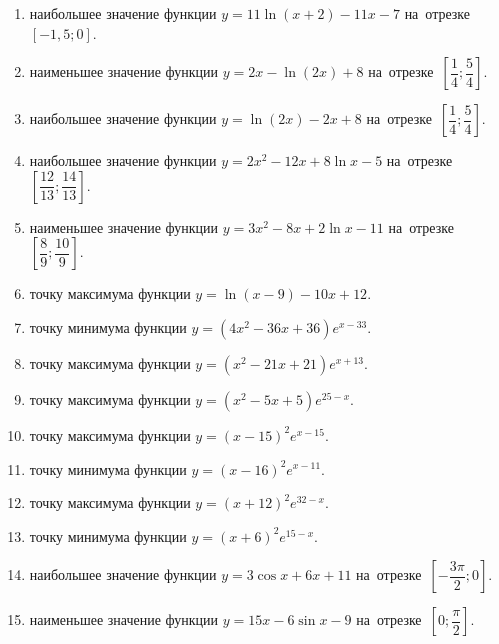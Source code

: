 \documentclass[a4paper,10pt]{article}
\begin{document}
\begin{enumerate}
\item {} наибольшее значение функции $y = 11\ln \left(x+2\right)-11x -7$ на~отрезке~$\left[-1,5;0\right]$.

\item {} наименьшее значение функции $y = 2x-\ln \left(2x\right)+8$ на~отрезке~$\left[\dfrac{1}{4};\dfrac{5}{4}\right]$.

\item {} наибольшее значение функции $y = \ln \left(2x\right)-2x+8$ на~отрезке~$\left[\dfrac{1}{4};\dfrac{5}{4}\right]$.

\item {} наибольшее значение функции $y=2x^2-12x+8\ln x-5$ на~отрезке~$\left[\dfrac{12}{13};\dfrac{14}{13}\right]$.

\item {} наименьшее значение функции $y=3x^2-8x+2\ln x-11$ на~отрезке~$\left[\dfrac{8}{9};\dfrac{10}{9}\right]$.

\item {} точку максимума функции $y=\ln \left(x-9\right)-10x+12$.

\item {} точку минимума функции $y=\left(4x^2-36x+36\right)e^{x-33}$.

\item {} точку максимума функции $y=\left(x^2-21x+21\right)e^{x+13}$.

\item {} точку максимума функции $y=\left(x^2-5x+5\right)e^{25-x}$.

\item {} точку максимума функции $y=\left(x -15\right)^2e^{x-15}$.

\item {} точку минимума функции $y=\left(x -16\right)^2e^{x-11}$.

\item {} точку максимума функции $y=\left(x +12\right)^2e^{32-x}$.

\item {} точку минимума функции $y=\left(x +6\right)^2e^{15-x}$.

\item {} наибольшее значение функции $y=3\cos x+6x +11$ на~отрезке~$\left[-\dfrac{3\pi }{2};0\right]$.

\item {} наименьшее значение функции $y=15x-6\sin x -9$ на~отрезке~$\left[0;\dfrac{\pi }{2}\right]$.


\end{enumerate}
\end{document}
